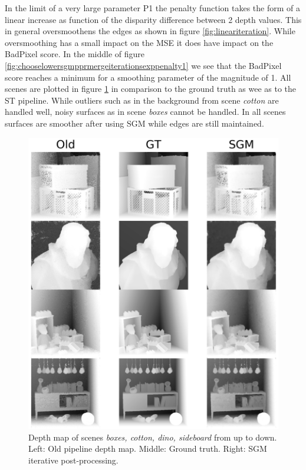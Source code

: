 \documentclass  [
  paper    = a4,
  BCOR     = 10mm,
  twoside,
  fontsize = 12pt,
  fleqn,
  toc      = bibnumbered,
  toc      = listofnumbered,
  numbers  = noendperiod,
  headings = normal,
  listof   = leveldown,
  version  = 3.03
]                                       {scrreprt}
\begin{document}
In the limit of a very large parameter P1 the penalty function takes the form of a linear increase as function of the disparity difference between 2 depth values. This in general oversmoothens the edges as shown in figure \ref{fig:lineariteration}. While oversmoothing has a small impact on the MSE it does have impact on the BadPixel score. In the middle of figure \ref{fig:chooselowersgmpprmergeiterationsexppenalty1} we see that the BadPixel score reaches a minimum for a smoothing parameter of the magnitude of 1.
All scenes are plotted in figure \ref{fig:sgmresultsiterative} in comparison to the ground truth as wee as to the ST pipeline. While outliers such as in the background from scene \textit{cotton} are handled well, noisy surfaces as in scene \textit{boxes} cannot be handled. In all scenes surfaces are smoother after using SGM while edges are still maintained.
\begin{figure}[h!]
	\centering
	\includegraphics[width=0.8\linewidth]{images/sgm_results_iterative.png}
	\caption[Iterative SGM: depth maps]{Depth map of scenes \textit{boxes, cotton, dino, sideboard} from up to down. Left: Old pipeline depth map. Middle: Ground truth. Right: SGM iterative post-processing.}
	\label{fig:sgmresultsiterative}
\end{figure}
\newpage
\end{document}
